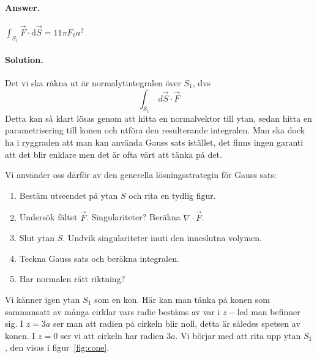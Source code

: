 \documentclass[%
oneside,                 %
final,                   %
10pt]{article}
\newenvironment{doconceexercise}{}{}
\begin{document}
\begin{doconceexercise}
\begin{itemize}
\noindent
\end{itemize}

\noindent


\paragraph{Answer.}
$\int_{S_1} \vec{F} \cdot \mbox{d}\vec{S} = 11 \pi F_0 a^2$



\paragraph{Solution.}
Det vi ska räkna ut är normalytintegralen över $S_1$, dvs 
\begin{equation}
\int_{S_1}\ d\vec{S}\cdot \vec{F}
\end{equation}
Detta kan så klart lösas genom att hitta en normalvektor till ytan, sedan hitta en parametrisering till konen och utföra den resulterande integralen. Man ska dock ha i ryggraden att man kan använda Gauss sats istället, det finns ingen garanti att det blir enklare men det är ofta värt att tänka på det.

Vi använder oss därför av den generella lösningsstrategin för Gauss sats:

\begin{enumerate}
\item Bestäm utseendet på ytan $S$ och rita en tydlig figur.

\item Undersök fältet $\vec{F}$. Singulariteter? Beräkna $\nabla \cdot \vec{F}$.

\item Slut ytan $S$. Undvik singulariteter inuti den inneslutna volymen.

\item Teckna Gauss sats och beräkna integralen.

\item Har normalen rätt riktning?
\end{enumerate}

\noindent
Vi känner igen ytan $S_1$ som en kon. Här kan man tänka på konen som sammansatt av många cirklar vars radie bestäms av var i $z-$led man befinner sig. I $z=3a$ ser man att radien på cirkeln blir noll, detta är således spetsen av konen. I $z=0$ ser vi att cirkeln har radien $3a$. Vi börjar med att rita upp ytan $S_1$, den visas i figur~\ref{fig:cone}. 



\end{doconceexercise}
\end{document}
